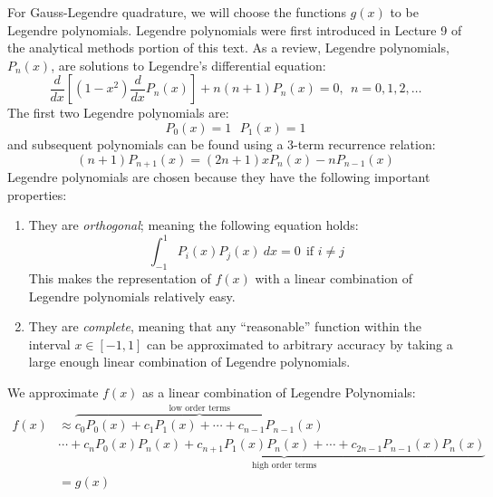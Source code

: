 For Gauss-Legendre quadrature, we will choose the functions $g(x)$ to be Legendre polynomials.  Legendre polynomials were first introduced in Lecture 9 of the analytical methods portion of this text.  As a review, Legendre polynomials, $P_n(x)$, are solutions to Legendre's differential equation:
\begin{equation}
\frac{d}{dx}\left[\left(1-x^2\right)\frac{d}{dx}P_n(x)\right] + n(n+1)P_n(x) = 0, \ \ n=0,1,2,\dots
\end{equation}
The first two Legendre polynomials are:
\begin{equation*}
P_0(x) = 1 \ \ \ P_1(x) = 1
\end{equation*}
and subsequent polynomials can be found using a 3-term recurrence relation:
\begin{equation}
(n+1)P_{n+1}(x) = (2n+1)xP_n(x)-nP_{n-1}(x)
\end{equation}
Legendre polynomials are chosen because they have the following important properties:
\begin{enumerate}
\item They are \emph{orthogonal}; meaning the following equation holds:
\begin{equation*}
\int_{-1}^{1}P_i(x)P_j(x) \ dx = 0 \ \ \text{if } i \ne j
\end{equation*}
This makes the representation of $f(x)$ with a linear combination of Legendre polynomials relatively easy.
\item They are \emph{complete}, meaning that any ``reasonable'' function within the interval $x\in[-1,1]$ can be approximated to arbitrary accuracy by taking a large enough linear combination of Legendre polynomials.
\end{enumerate}
We approximate $f(x)$ as a linear combination of Legendre Polynomials:
\begin{align*}
f(x) &\approx \overbrace{c_0 P_0(x) + c_1P_1(x) + \cdots + c_{n-1}P_{n-1}(x)}^{\text{low order terms}} \\ 
&\cdots + \underbrace{c_{n}P_0(x)P_{n}(x) + c_{n+1}P_1(x)P_n(x) + \cdots + c_{2n-1}P_{n-1}(x)P_{n}(x)}_{\text{high order terms}} \\
&= g(x)
\end{align*}
